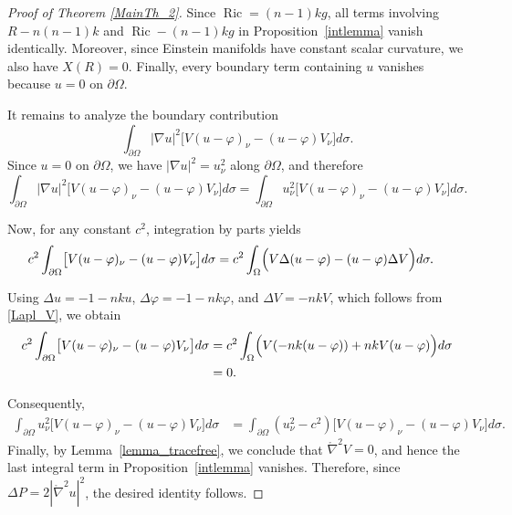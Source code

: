 \documentclass[reqno,11pt]{amsart}
\numberwithin{equation}{section}  %
\begin{document}
\begin{proof}[Proof of Theorem \ref{MainTh_2}]
Since $\operatorname{Ric}=(n-1)kg$, all terms involving
$R-n(n-1)k$ and $\operatorname{Ric}-(n-1)kg$ in Proposition~\ref{intlemma}
vanish identically. Moreover, since Einstein manifolds have constant scalar curvature, we also have $X(R)=0$. Finally, every boundary term containing $u$ vanishes because $u=0$ on $\partial\Omega$.

It remains to analyze the boundary contribution
\[
\int_{\partial\Omega}|\nabla u|^{2}
\bigl[V(u-\varphi)_{\nu}-(u-\varphi)V_{\nu}\bigr]d\sigma.
\]
Since $u=0$ on $\partial\Omega$, we have
$|\nabla u|^{2}=u_{\nu}^{2}$ along $\partial\Omega$, and therefore
\[
\int_{\partial\Omega}|\nabla u|^{2}
\bigl[V(u-\varphi)_{\nu}-(u-\varphi)V_{\nu}\bigr]d\sigma
=
\int_{\partial\Omega}u_{\nu}^{2}
\bigl[V(u-\varphi)_{\nu}-(u-\varphi)V_{\nu}\bigr]d\sigma.
\]

Now, for any constant $c^{2}$, integration by parts yields
\begin{align*}
c^{2}\int_{\partial\Omega}
\bigl[V(u-\varphi)_{\nu}-(u-\varphi)V_{\nu}\bigr]d\sigma
&=
c^{2}\int_{\Omega}
\Bigl(V\Delta(u-\varphi)-(u-\varphi)\Delta V\Bigr)d\sigma.
\end{align*}

Using $\Delta u=-1-nku$, $\Delta\varphi=-1-nk\varphi$, and $\Delta V=-nkV$, which follows from \eqref{Lapl_V}, we obtain
\begin{align*}
c^{2}\int_{\partial\Omega}
\bigl[V(u-\varphi)_{\nu}-(u-\varphi)V_{\nu}\bigr]d\sigma
&=
c^{2}\int_{\Omega}
\Bigl(V(-nk(u-\varphi))+nkV(u-\varphi)\Bigr)d\sigma \\
&=0.
\end{align*}

Consequently,
\begin{align*}
\int_{\partial\Omega}u_{\nu}^{2}
\bigl[V(u-\varphi)_{\nu}-(u-\varphi)V_{\nu}\bigr]d\sigma
&=
\int_{\partial\Omega}(u_{\nu}^{2}-c^{2})
\bigl[V(u-\varphi)_{\nu}-(u-\varphi)V_{\nu}\bigr]d\sigma.
\end{align*}
Finally, by Lemma~\ref{lemma_tracefree}, we conclude that $\mathring{\nabla}^{2}V=0$, and hence the last integral term in Proposition~\ref{intlemma} vanishes. Therefore, since $\Delta P = 2|\mathring{\nabla}^{2}u|^{2}$, the desired identity follows.



\end{proof}
\end{document}
